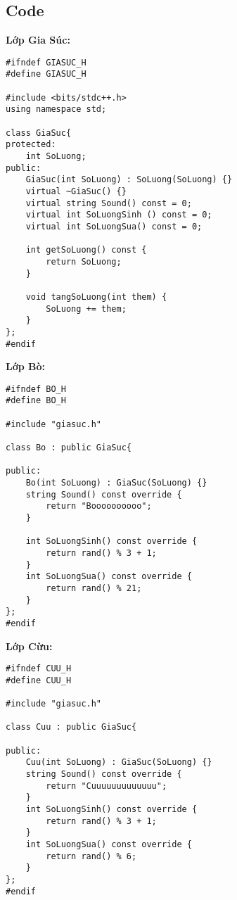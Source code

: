 \subsection{Code}
\item {\textbf{Lớp Gia Súc: }}
\begin{verbatim}
#ifndef GIASUC_H
#define GIASUC_H

#include <bits/stdc++.h> 
using namespace std;

class GiaSuc{
protected:
    int SoLuong;
public: 
    GiaSuc(int SoLuong) : SoLuong(SoLuong) {}
    virtual ~GiaSuc() {} 
    virtual string Sound() const = 0;
    virtual int SoLuongSinh () const = 0;
    virtual int SoLuongSua() const = 0;

    int getSoLuong() const {
        return SoLuong;
    }

    void tangSoLuong(int them) {
        SoLuong += them;
    }
};
#endif
\end{verbatim}

\item {\textbf{Lớp Bò: }}
\begin{verbatim}
#ifndef BO_H
#define BO_H

#include "giasuc.h"

class Bo : public GiaSuc{

public: 
    Bo(int SoLuong) : GiaSuc(SoLuong) {}
    string Sound() const override {
        return "Boooooooooo";
    }

    int SoLuongSinh() const override {
        return rand() % 3 + 1;
    }
    int SoLuongSua() const override {
        return rand() % 21;
    }
};
#endif
\end{verbatim}

\item {\textbf{Lớp Cừu: }}
\begin{verbatim}
#ifndef CUU_H
#define CUU_H

#include "giasuc.h"

class Cuu : public GiaSuc{

public: 
    Cuu(int SoLuong) : GiaSuc(SoLuong) {}
    string Sound() const override {
        return "Cuuuuuuuuuuuuu";
    }
    int SoLuongSinh() const override {
        return rand() % 3 + 1;
    }
    int SoLuongSua() const override {
        return rand() % 6;
    }
};
#endif
\end{verbatim}

